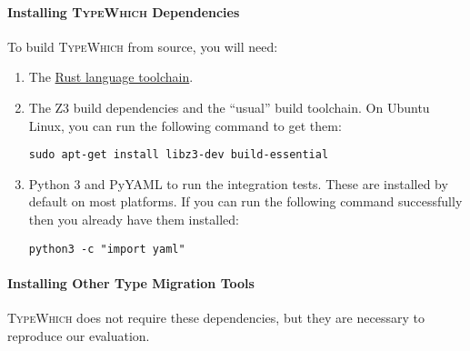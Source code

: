 \documentclass{article}
\newcommand{\system}{\textsc{TypeWhich}\xspace}
\begin{document}
\paragraph{Installing \system Dependencies}

To build \system from source, you will need:

\begin{enumerate}

\item The \href{https://rustup.rs/}{Rust language toolchain}.

\item The Z3 build dependencies and the ``usual'' build toolchain. On Ubuntu Linux, you can run the following
command to get them:

\begin{verbatim}
sudo apt-get install libz3-dev build-essential
\end{verbatim}

\item Python 3 and PyYAML to run the integration tests. These are installed by
default on most platforms. If you can run the following command successfully
then you already have them installed:
\begin{verbatim}
python3 -c "import yaml"
\end{verbatim}

\end{enumerate}

\paragraph{Installing Other Type Migration Tools}

\system does not require these dependencies, but they are necessary to reproduce
our evaluation.
\end{document}

